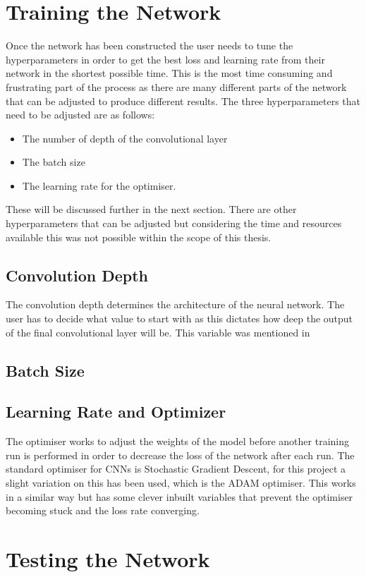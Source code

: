 \section{Training the Network}
Once the network has been constructed the user needs to tune the hyperparameters in order to get the best loss and learning rate from their network in the shortest possible time. This is the most time consuming and frustrating part of the process as there are many different parts of the network that can be adjusted to produce different results. The three hyperparameters that need to be adjusted are as follows:
\begin{itemize}
    \item The number of depth of the convolutional layer
    \item The batch size
    \item The learning rate for the optimiser.
\end{itemize}
These will be discussed further in the next section. There are other hyperparameters that can be adjusted but considering the time and resources available this was not possible within the scope of this thesis.
\subsection{Convolution Depth}
The convolution depth determines the architecture of the neural network. The user has to decide what value to start with as this dictates how deep the output of the final convolutional layer will be. This variable was mentioned in 
\subsection{Batch Size}
\subsection{Learning Rate and Optimizer}
The optimiser works to adjust the weights of the model before another training run is performed in order to decrease the loss of the network after each run. 
The standard optimiser for CNNs is Stochastic Gradient Descent, for this project a slight variation on this has been used, which is the ADAM optimiser. This works in a similar way but has some clever inbuilt variables that prevent the optimiser becoming stuck and the loss rate converging.

\section{Testing the Network}